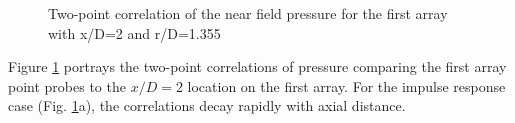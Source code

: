 \documentclass[english]{aiaa-tc}
\begin{document}
\begin{figure}
\begin{centering}
\end{centering}
\caption{Two-point correlation of the near field pressure for the first array with x/D=2 and r/D=1.355}\label{2ptCorrel}
\end{figure}
Figure \ref{2ptCorrel} portrays the two-point correlations of pressure comparing the first array point probes to the $x/D=2$ location on the first array. For the impulse response case (Fig. \ref{2ptCorrel}a), the correlations decay rapidly with axial distance. 
\end{document}

